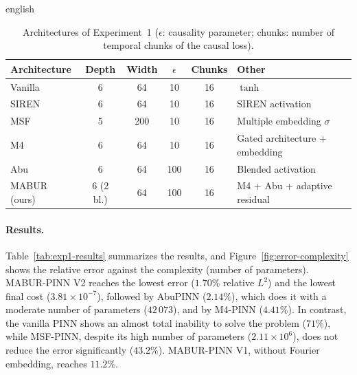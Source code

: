 \documentclass[../0000.tex]{subfiles}
\begin{document}
\begin{hyphenrules}{english}
\begin{table}[htbp]
  \centering
  \caption[Architectures of Experiment~1]{Architectures of Experiment~1 ($\epsilon$: causality parameter; chunks: number of temporal
  chunks of the causal loss).}
  \label{tab:exp1-architectures}
  \small
  \begin{tabularx}{\linewidth}{@{}lccccX@{}}
    \toprule
    Architecture & Depth & Width & $\epsilon$ & Chunks & Other \\
    \midrule
    Vanilla \cite{raissi2019} & 6 & 64 & 10 & 16 & $\tanh$ \\
    SIREN \cite{sitzmann2020} & 6 & 64 & 10 & 16 & SIREN activation \\
    MSF \cite{wang2021eigenvector} & 5 & 200 & 10 & 16 & Multiple embedding $\sigma$ \\
    M4 \cite{wang2021gradient} & 6 & 64 & 10 & 16 & Gated architecture + embedding \\
    Abu \cite{wang2023abu} & 6 & 64 & 100 & 16 & Blended activation \\
    MABUR (ours) & 6 (2 bl.) & 64 & 100 & 16 & M4 + Abu + adaptive residual \\
    \bottomrule
  \end{tabularx}
\end{table}

\paragraph{Results.}
Table~\ref{tab:exp1-results} summarizes the results, and Figure~\ref{fig:error-complexity} shows the relative error
against the complexity (number of parameters). MABUR-PINN V2 reaches the lowest error ($1.70\%$ relative
$L^2$) and the lowest final cost ($3.81\times10^{-7}$), followed by AbuPINN ($2.14\%$), which does it with
a moderate number of parameters ($42\,073$), and by M4-PINN ($4.41\%$). In contrast, the vanilla PINN shows
an almost total inability to solve the problem ($71\%$), while MSF-PINN, despite its high number of
parameters ($2.11\times10^{6}$), does not reduce the error significantly ($43.2\%$). MABUR-PINN V1, without
Fourier embedding, reaches $11.2\%$.


\end{hyphenrules}
\end{document}

